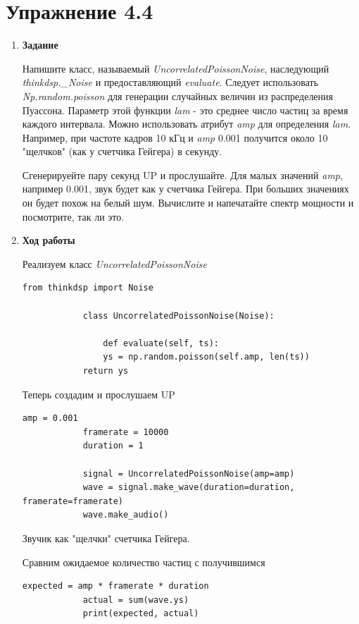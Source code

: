 \documentclass[a4paper,12pt]{article}
\begin{document}
	\section{Упражнение 4.4}
	
	\begin{enumerate}
		
		\item \textbf{Задание}
		
		Напишите класс, называемый \textit{UncorrelatedPoissonNoise}, наследующий \textit{thinkdsp.\_Noise} и предоставляющий \textit{evaluate}. Следует использовать \textit{Np.random.poisson} для генерации случайных величин из распределения Пуассона. Параметр этой функции \textit{lam} - это среднее число частиц за время каждого интервала. Можно использовать атрибут \textit{amp} для определения \textit{lam}. Например, при частоте кадров 10 кГц и \textit{amp} 0.001 получится около 10 "щелчков" (как у счетчика Гейгера) в секунду.
		
		Сгенерируейте пару секунд UP и прослушайте. Для малых значений \textit{amp}, например 0.001, звук будет как у счетчика Гейгера. При больших значениях он будет похож на белый шум. Вычислите и напечатайте спектр мощности и посмотрите, так ли это.
		
		
		\item \textbf{Ход работы}
		
		Реализуем класс \textit{UncorrelatedPoissonNoise}
		\begin{lstlisting}[caption=Класс UncorrelatedPoissonNoise]
			from thinkdsp import Noise
			
			class UncorrelatedPoissonNoise(Noise):
			
				def evaluate(self, ts):
				ys = np.random.poisson(self.amp, len(ts))
			return ys
		\end{lstlisting}
		
		Теперь создадим и прослушаем UP
		\begin{lstlisting}[caption=Создание и воспроизведение UP]
			amp = 0.001
			framerate = 10000
			duration = 1
			
			signal = UncorrelatedPoissonNoise(amp=amp)
			wave = signal.make_wave(duration=duration, framerate=framerate)
			wave.make_audio()
		\end{lstlisting}
		
		Звучик как "щелчки" счетчика Гейгера.
		
		Сравним ожидаемое количество частиц с получившимся
		\begin{lstlisting}[caption=Создание и воспроизведение UP]
			expected = amp * framerate * duration
			actual = sum(wave.ys)
			print(expected, actual)
			

\end{lstlisting}
\end{enumerate}
\end{document}

